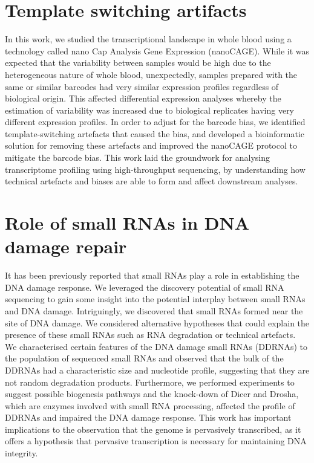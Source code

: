 \documentclass[10pt,a4paper]{report}
\begin{document}
\chapter{Template switching artifacts}\label{template_switching}


In this work, we studied the transcriptional landscape in whole blood using a technology called nano Cap Analysis Gene Expression (nanoCAGE). While it was expected that the variability between samples would be high due to the heterogeneous nature of whole blood, unexpectedly, samples prepared with the same or similar barcodes had very similar expression profiles regardless of biological origin. This affected differential expression analyses whereby the estimation of variability was increased due to biological replicates having very different expression profiles. In order to adjust for the barcode bias, we identified template-switching artefacts that caused the bias, and developed a bioinformatic solution for removing these artefacts and improved the nanoCAGE protocol to mitigate the barcode bias. This work laid the groundwork for analysing transcriptome profiling using high-throughput sequencing, by understanding how technical artefacts and biases are able to form and affect downstream analyses.



\chapter{Role of small RNAs in DNA damage repair}\label{ddrna}


It has been previously reported that small RNAs play a role in establishing the DNA damage response\cite{pmid19444217}. We leveraged the discovery potential of small RNA sequencing to gain some insight into the potential interplay between small RNAs and DNA damage. Intriguingly, we discovered that small RNAs formed near the site of DNA damage. We considered alternative hypotheses that could explain the presence of these small RNAs such as RNA degradation or technical artefacts. We characterised certain features of the DNA damage small RNAs (DDRNAs) to the population of sequenced small RNAs and observed that the bulk of the DDRNAs had a characteristic size and nucleotide profile, suggesting that they are not random degradation products. Furthermore, we performed experiments to suggest possible biogenesis pathways and the knock-down of Dicer and Drosha, which are enzymes involved with small RNA processing, affected the profile of DDRNAs and impaired the DNA damage response. This work has important implications to the observation that the genome is pervasively transcribed, as it offers a hypothesis that pervasive transcription is necessary for maintaining DNA integrity.
\end{document}
